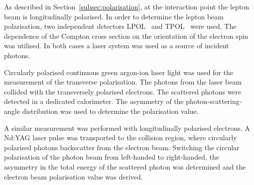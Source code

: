 As described in Section~\ref{subsec:polarisation}, at the interaction point the lepton beam is longitudinally polarised. In order to determine the lepton beam polarisation, two independent detectors LPOL~\cite{nim:a479:334} and TPOL~\cite{nim:a329:79} were used.
The dependence of the Compton cross section on the orientation of the electron spin was utilised. In both cases a laser system was used as a source of incident photons.

Circularly polarised continuous green argon-ion laser light was used for the measurement of the transverse polarisation. The photons from the laser beam collided with the transversely polarised electrons. The scattered photons were detected in a dedicated calorimeter. The asymmetry of the photon-scattering-angle distribution was used to determine the polarisation value.

A similar measurement was performed with longitudinally polarised electrons. A Nd:YAG laser pulse was transported to the collision region, where circularly polarised photons backscatter from the electron beam. Switching the circular polarisation of the photon beam from left-handed to right-handed, the asymmetry in the total energy of the scattered photon was determined and the electron beam polarisation value was derived.
